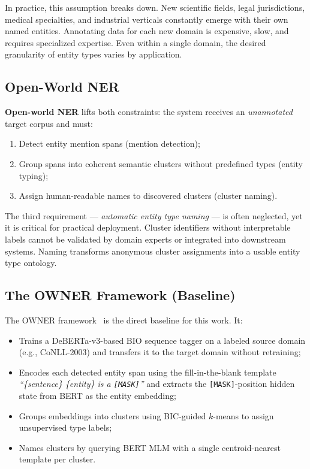 \documentclass[11pt,a4paper]{article}
\begin{document}
In practice, this assumption breaks down. New scientific fields, legal jurisdictions, medical specialties, and industrial verticals constantly emerge with their own named entities. Annotating data for each new domain is expensive, slow, and requires specialized expertise. Even within a single domain, the desired granularity of entity types varies by application.

\subsection{Open-World NER}

\textbf{Open-world NER} lifts both constraints: the system receives an \emph{unannotated} target corpus and must:
\begin{enumerate}[noitemsep]
  \item Detect entity mention spans (mention detection);
  \item Group spans into coherent semantic clusters without predefined types (entity typing);
  \item Assign human-readable names to discovered clusters (cluster naming).
\end{enumerate}

The third requirement — \emph{automatic entity type naming} — is often neglected, yet it is critical for practical deployment. Cluster identifiers without interpretable labels cannot be validated by domain experts or integrated into downstream systems. Naming transforms anonymous cluster assignments into a usable entity type ontology.

\subsection{The OWNER Framework (Baseline)}

The OWNER framework~\cite{wang2023} is the direct baseline for this work. It:
\begin{itemize}[noitemsep]
  \item Trains a DeBERTa-v3-based BIO sequence tagger on a labeled source domain (e.g., CoNLL-2003) and transfers it to the target domain without retraining;
  \item Encodes each detected entity span using the fill-in-the-blank template \emph{``\{sentence\} \{entity\} is a \texttt{[MASK]}''} and extracts the \texttt{[MASK]}-position hidden state from BERT as the entity embedding;
  \item Groups embeddings into clusters using BIC-guided $k$-means to assign unsupervised type labels;
  \item Names clusters by querying BERT MLM with a single centroid-nearest template per cluster.
\end{itemize}
\end{document}

